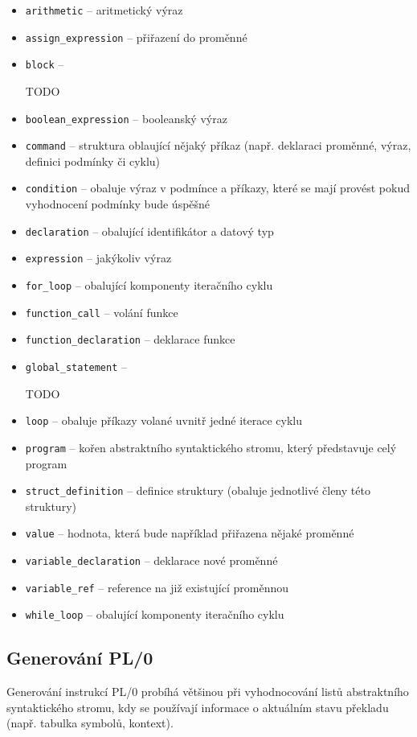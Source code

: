 \documentclass[12pt, a4paper]{article}
\begin{document}
\begin{itemize}
    \item \texttt{arithmetic} -- aritmetický výraz
    \item \texttt{assign\_expression} -- přiřazení do proměnné
    \item \texttt{block} -- \begin{huge} TODO \end{huge}
    \item \texttt{boolean\_expression} -- booleanský výraz
    \item \texttt{command} -- struktura oblaující nějaký příkaz (např. deklaraci proměnné, výraz, definici podmínky či cyklu)
    \item \texttt{condition} -- obaluje výraz v podmínce a příkazy, které se mají provést pokud vyhodnocení podmínky bude úspěšné
    \item \texttt{declaration} -- obalující identifikátor a datový typ
    \item \texttt{expression} -- jakýkoliv výraz
    \item \texttt{for\_loop} -- obalující komponenty iteračního cyklu
    \item \texttt{function\_call} -- volání funkce
    \item \texttt{function\_declaration} -- deklarace funkce
    \item \texttt{global\_statement} -- \begin{huge} TODO \end{huge}
    \item \texttt{loop} -- obaluje příkazy volané uvnitř jedné iterace cyklu
    \item \texttt{program} -- kořen abstraktního syntaktického stromu, který představuje celý program
    \item \texttt{struct\_definition} -- definice struktury (obaluje jednotlivé členy této struktury)
    \item \texttt{value} -- hodnota, která bude například přiřazena nějaké proměnné
    \item \texttt{variable\_declaration} -- deklarace nové proměnné
    \item \texttt{variable\_ref} -- reference na již existující proměnnou
    \item \texttt{while\_loop} -- obalující komponenty iteračního cyklu
\end{itemize}


\subsection{Generování PL/0}
Generování instrukcí PL/0 probíhá většinou při vyhodnocování listů abstraktního syntaktického stromu, kdy se používají informace o aktuálním stavu překladu (např. tabulka symbolů, kontext). 
\end{document}
